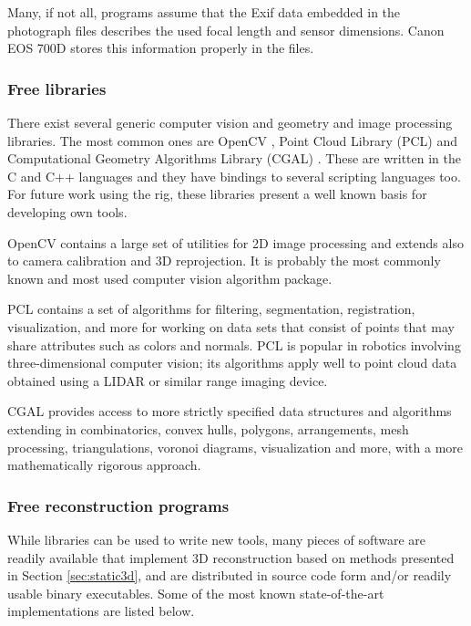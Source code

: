 Many, if not all, programs assume that the Exif data embedded in the photograph files describes the used focal length and sensor dimensions.
Canon EOS 700D stores this information properly in the files.


\subsubsection{Free libraries} %

There exist several generic computer vision and geometry and image processing libraries.
The most common ones are OpenCV \cite{opencv}, Point Cloud Library (PCL) \cite{pcl} and Computational Geometry Algorithms Library (CGAL) \cite{cgal}.
These are written in the C and C++ languages and they have bindings to several scripting languages too.
For future work using the rig, these libraries present a well known basis for developing own tools.

OpenCV contains a large set of utilities for 2D image processing and extends also to camera calibration and 3D reprojection.
It is probably the most commonly known and most used computer vision algorithm package.

PCL contains a set of algorithms for filtering, segmentation, registration, visualization, and more for working on data sets that consist of points that may share attributes such as colors and normals.
PCL is popular in robotics involving three-dimensional computer vision; its algorithms apply well to point cloud data obtained using a LIDAR or similar range imaging device.

CGAL provides access to more strictly specified data structures and algorithms extending in combinatorics, convex hulls, polygons, arrangements, mesh processing, triangulations, voronoi diagrams, visualization and more, with a more mathematically rigorous approach.


\subsubsection{Free reconstruction programs} %

While libraries can be used to write new tools, many pieces of software are readily available that implement 3D reconstruction based on methods presented in Section \ref{sec:static3d}, and are distributed in source code form and/or readily usable binary executables.
Some of the most known state-of-the-art implementations are listed below.

